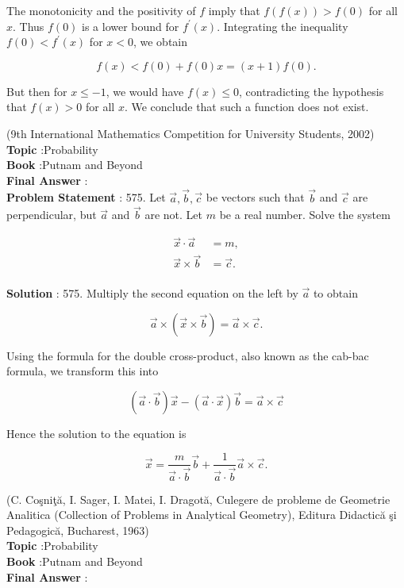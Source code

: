\documentclass[10pt]{article}
\begin{document}
The monotonicity and the positivity of $f$ imply that $f(f(x))>f(0)$ for all $x$. Thus $f(0)$ is a lower bound for $f^{\prime}(x)$. Integrating the inequality $f(0)<f^{\prime}(x)$ for $x<0$, we obtain

$$
f(x)<f(0)+f(0) x=(x+1) f(0) .
$$

But then for $x \leq-1$, we would have $f(x) \leq 0$, contradicting the hypothesis that $f(x)>0$ for all $x$. We conclude that such a function does not exist.

(9th International Mathematics Competition for University Students, 2002)
\\
\textbf{Topic} :Probability\\
\textbf{Book} :Putnam and Beyond\\
\textbf{Final Answer} :\\


\textbf{Problem Statement} :
575. Let $\vec{a}, \vec{b}, \vec{c}$ be vectors such that $\vec{b}$ and $\vec{c}$ are perpendicular, but $\vec{a}$ and $\vec{b}$ are not. Let $m$ be a real number. Solve the system

$$
\begin{aligned}
\vec{x} \cdot \vec{a} &=m, \\
\vec{x} \times \vec{b} &=\vec{c} .
\end{aligned}
$$
\\
\textbf{Solution} :
575. Multiply the second equation on the left by $\vec{a}$ to obtain

$$
\vec{a} \times(\vec{x} \times \vec{b})=\vec{a} \times \vec{c} .
$$

Using the formula for the double cross-product, also known as the cab-bac formula, we transform this into

$$
(\vec{a} \cdot \vec{b}) \vec{x}-(\vec{a} \cdot \vec{x}) \vec{b}=\vec{a} \times \vec{c}
$$

Hence the solution to the equation is

$$
\vec{x}=\frac{m}{\vec{a} \cdot \vec{b}} \vec{b}+\frac{1}{\vec{a} \cdot \vec{b}} \vec{a} \times \vec{c} .
$$

(C. Coşniţă, I. Sager, I. Matei, I. Dragotă, Culegere de probleme de Geometrie Analitica (Collection of Problems in Analytical Geometry), Editura Didactică şi Pedagogică, Bucharest, 1963)
\\
\textbf{Topic} :Probability\\
\textbf{Book} :Putnam and Beyond\\
\textbf{Final Answer} :\\
\end{document}
